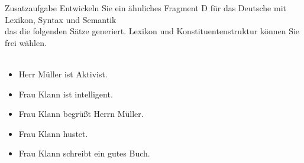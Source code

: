 \begin{frame}
  {Zusatzaufgabe}
  \onslide<+->
  \onslide<+->
  \small Entwickeln Sie ein ähnliches Fragment D für das Deutsche mit Lexikon, Syntax und Semantik\\
  das die folgenden Sätze generiert. Lexikon und Konstituentenstruktur können Sie frei wählen.\\
  \Halbzeile
  \\
  \onslide<+->
  \Halbzeile
  \begin{itemize}[<+->]
    \item Herr Müller ist Aktivist.
    \item Frau Klann ist intelligent.
    \item Frau Klann begrüßt Herrn Müller.
    \item Frau Klann hustet.
    \item Frau Klann schreibt ein gutes Buch.
  \end{itemize}
\end{frame}
